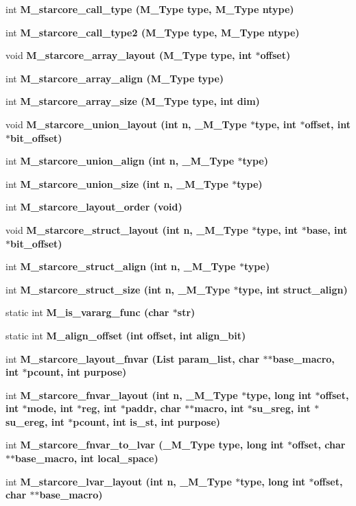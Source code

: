 \begin{CompactItemize}
\item 
int \bf{M\_\-starcore\_\-call\_\-type} (\bf{M\_\-Type} type, \bf{M\_\-Type} ntype)
\item 
int \bf{M\_\-starcore\_\-call\_\-type2} (\bf{M\_\-Type} type, \bf{M\_\-Type} ntype)
\item 
void \bf{M\_\-starcore\_\-array\_\-layout} (\bf{M\_\-Type} type, int $\ast$offset)
\item 
int \bf{M\_\-starcore\_\-array\_\-align} (\bf{M\_\-Type} type)
\item 
int \bf{M\_\-starcore\_\-array\_\-size} (\bf{M\_\-Type} type, int dim)
\item 
void \bf{M\_\-starcore\_\-union\_\-layout} (int n, \bf{\_\-M\_\-Type} $\ast$type, int $\ast$offset, int $\ast$bit\_\-offset)
\item 
int \bf{M\_\-starcore\_\-union\_\-align} (int n, \bf{\_\-M\_\-Type} $\ast$type)
\item 
int \bf{M\_\-starcore\_\-union\_\-size} (int n, \bf{\_\-M\_\-Type} $\ast$type)
\item 
int \bf{M\_\-starcore\_\-layout\_\-order} (void)
\item 
void \bf{M\_\-starcore\_\-struct\_\-layout} (int n, \bf{\_\-M\_\-Type} $\ast$type, int $\ast$base, int $\ast$bit\_\-offset)
\item 
int \bf{M\_\-starcore\_\-struct\_\-align} (int n, \bf{\_\-M\_\-Type} $\ast$type)
\item 
int \bf{M\_\-starcore\_\-struct\_\-size} (int n, \bf{\_\-M\_\-Type} $\ast$type, int struct\_\-align)
\item 
static int \bf{M\_\-is\_\-vararg\_\-func} (char $\ast$str)
\item 
static int \bf{M\_\-align\_\-offset} (int offset, int align\_\-bit)
\item 
int \bf{M\_\-starcore\_\-layout\_\-fnvar} (\bf{List} param\_\-list, char $\ast$$\ast$base\_\-macro, int $\ast$pcount, int purpose)
\item 
int \bf{M\_\-starcore\_\-fnvar\_\-layout} (int n, \bf{\_\-M\_\-Type} $\ast$type, long int $\ast$offset, int $\ast$\bf{mode}, int $\ast$reg, int $\ast$paddr, char $\ast$$\ast$macro, int $\ast$su\_\-sreg, int $\ast$su\_\-ereg, int $\ast$pcount, int is\_\-st, int purpose)
\item 
int \bf{M\_\-starcore\_\-fnvar\_\-to\_\-lvar} (\bf{\_\-M\_\-Type} type, long int $\ast$offset, char $\ast$$\ast$base\_\-macro, int local\_\-space)
\item 
int \bf{M\_\-starcore\_\-lvar\_\-layout} (int n, \bf{\_\-M\_\-Type} $\ast$type, long int $\ast$offset, char $\ast$$\ast$base\_\-macro)

\end{CompactItemize}
